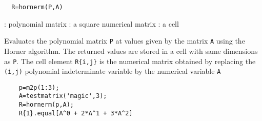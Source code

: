 \begin{mandesc}
\end{mandesc}
\begin{calling_sequence}
\begin{verbatim}
  R=hornerm(P,A)
\end{verbatim}
\end{calling_sequence}
\begin{parameters}
  \begin{varlist}
    : polynomial matrix
    : a square numerical matrix
    : a cell 
  \end{varlist}
\end{parameters}
\begin{mandescription}
  Evaluates the polynomial matrix \verb!P! at values given by the 
  matrix \verb!A! using the Horner algorithm. The returned values 
  are stored in a cell with same dimensions as \verb!P!.
  The cell element \verb!R{i,j}! is the numerical matrix obtained 
  by replacing the \verb!(i,j)! polynomial indeterminate variable by
  the numerical variable \verb!A!
\end{mandescription}
\begin{examples}
  \begin{Verbatim}
    p=m2p(1:3);
    A=testmatrix('magic',3);
    R=hornerm(p,A); 
    R{1}.equal[A^0 + 2*A^1 + 3*A^2]
  \end{Verbatim}
\end{examples}
